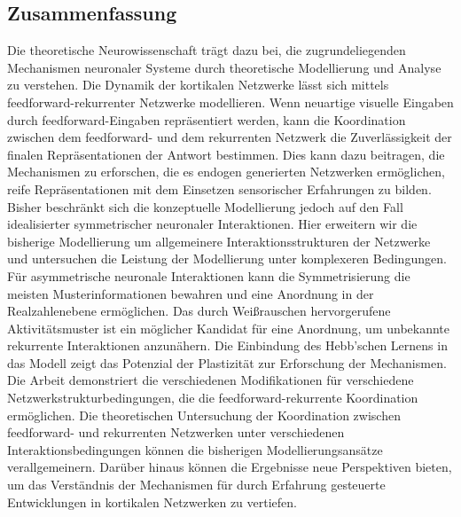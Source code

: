 \documentclass[11pt]{article}
\begin{document}
	\begin{titlepage}

	\section*{Zusammenfassung}
	
	Die theoretische Neurowissenschaft trägt dazu bei, die zugrundeliegenden Mechanismen neuronaler Systeme durch theoretische Modellierung und Analyse zu verstehen. Die Dynamik der kortikalen Netzwerke lässt sich mittels feedforward-rekurrenter Netzwerke modellieren. Wenn neuartige visuelle Eingaben durch feedforward-Eingaben repräsentiert werden, kann die Koordination zwischen dem feedforward- und dem rekurrenten Netzwerk die Zuverlässigkeit der finalen Repräsentationen der Antwort bestimmen. Dies kann dazu beitragen, die Mechanismen zu erforschen, die es endogen generierten Netzwerken ermöglichen, reife Repräsentationen mit dem Einsetzen sensorischer Erfahrungen zu bilden. Bisher beschränkt sich die konzeptuelle Modellierung jedoch auf den Fall idealisierter symmetrischer neuronaler Interaktionen. Hier erweitern wir die bisherige Modellierung um allgemeinere Interaktionsstrukturen der Netzwerke und untersuchen die Leistung der Modellierung unter komplexeren Bedingungen.
	Für asymmetrische neuronale Interaktionen kann die Symmetrisierung die meisten Musterinformationen bewahren und eine Anordnung in der Realzahlenebene ermöglichen. Das durch Weißrauschen hervorgerufene Aktivitätsmuster ist ein möglicher Kandidat für eine Anordnung, um unbekannte rekurrente Interaktionen anzunähern. Die Einbindung des Hebb'schen Lernens in das Modell zeigt das Potenzial der Plastizität zur Erforschung der Mechanismen. Die Arbeit demonstriert die verschiedenen Modifikationen für verschiedene Netzwerkstrukturbedingungen, die die feedforward-rekurrente Koordination ermöglichen.
	Die theoretischen Untersuchung der Koordination zwischen feedforward- und rekurrenten Netzwerken unter verschiedenen Interaktionsbedingungen können die bisherigen Modellierungsansätze verallgemeinern. Darüber hinaus können die Ergebnisse neue Perspektiven bieten, um das Verständnis der Mechanismen für durch Erfahrung gesteuerte Entwicklungen in kortikalen Netzwerken zu vertiefen.
	
	\end{titlepage}
	
\end{document}
